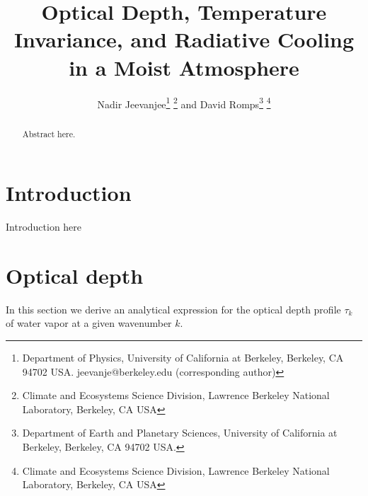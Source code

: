\documentclass[10pt]{article}
\begin{document}
%
%


\title{Optical Depth, Temperature Invariance, and Radiative Cooling  in a Moist Atmosphere}

%
%


 \author{Nadir Jeevanjee\footnote{Department of Physics, University of California at Berkeley, Berkeley, CA 94702  USA. jeevanje@berkeley.edu (corresponding author)} \footnote{Climate and Ecosystems Science Division, Lawrence Berkeley National Laboratory, Berkeley, CA USA} and David Romps\footnote{Department of Earth and Planetary Sciences, University of California at Berkeley, Berkeley, CA 94702  USA.} \footnote{Climate and Ecosystems Science Division, Lawrence Berkeley National Laboratory, Berkeley, CA USA}
}

\maketitle

\begin{abstract}
Abstract here.

%
%
\end{abstract}


%
%


\section {Introduction}
Introduction here

\section{Optical depth}
In this section we derive an analytical expression for the optical depth profile  $\tau_k$ of water vapor at a given wavenumber $k$.
\end{document}
